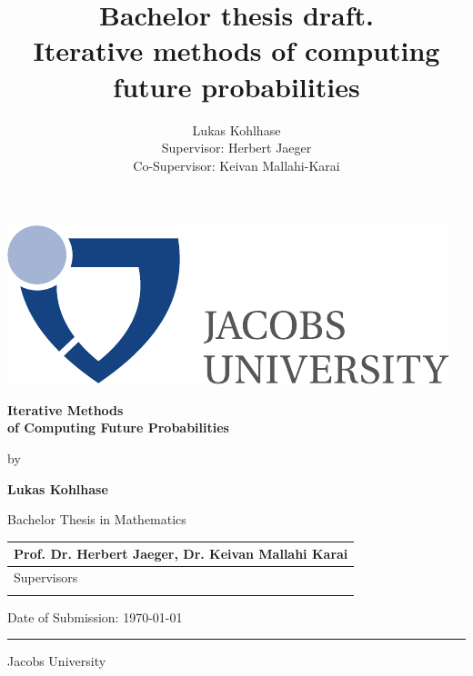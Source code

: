 \documentclass{article}
\author{Lukas Kohlhase \\ Supervisor: Herbert Jaeger \\ Co-Supervisor: Keivan Mallahi-Karai}
\title{Bachelor thesis draft. \\ Iterative methods of computing future probabilities}
\theoremstyle{definition}
\newcommand{\myname}{Lukas Kohlhase}
\newcommand{\mytitle}{Iterative Methods \\of Computing Future Probabilities}
\newcommand{\mysupervisor}{\bf{Prof. Dr. Herbert Jaeger, Dr. Keivan Mallahi Karai}}
\begin{document}
  \thispagestyle{empty}

  \begin{flushright}
   \includegraphics[scale=0.7]{bsc-logo}
  \end{flushright}
  \vspace{20mm}
  \begin{center}
    \huge
    \textbf{\mytitle}
  \end{center}
  \vspace*{4mm}
  \begin{center}
   \Large by
  \end{center}
  \vspace*{4mm}
  \begin{center}
    \Large
    \textbf{\myname}
  \end{center}
  \vspace*{20mm}
  \begin{center}
    \large
    Bachelor Thesis in Mathematics
  \end{center}
  \vfill
  \begin{flushright}
    \large
    \begin{tabular}{l}
      \mysupervisor \\
      \hline
      Supervisors \\
      \\
    \end{tabular}
  \end{flushright}
  \vspace*{8mm}
  \begin{flushleft}
    \large
    Date of Submission: \today \\
    \rule{\textwidth}{1pt}
  \end{flushleft}
  \begin{center}
    \Large Jacobs University
  \end{center}
\end{document}
